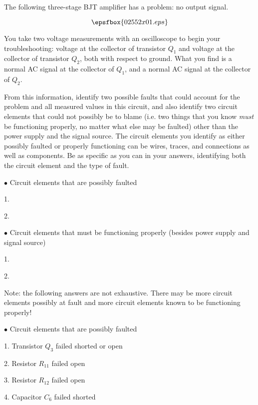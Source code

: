 

The following three-stage BJT amplifier has a problem: no output signal.

$$\epsfbox{02552x01.eps}$$

You take two voltage measurements with an oscilloscope to begin your troubleshooting: voltage at the collector of transistor $Q_1$ and voltage at the collector of transistor $Q_2$, both with respect to ground.  What you find is a normal AC signal at the collector of $Q_1$, and a normal AC signal at the collector of $Q_2$.

From this information, identify two possible faults that could account for the problem and all measured values in this circuit, and also identify two circuit elements that could not possibly be to blame (i.e. two things that you know {\it must} be functioning properly, no matter what else may be faulted) other than the power supply and the signal source.  The circuit elements you identify as either possibly faulted or properly functioning can be wires, traces, and connections as well as components.  Be as specific as you can in your answers, identifying both the circuit element and the type of fault.

\medskip
\goodbreak
\item{$\bullet$} Circuit elements that are possibly faulted
\item{1.}
\item{2.} 
\medskip

\medskip
\goodbreak
\item{$\bullet$} Circuit elements that must be functioning properly (besides power supply and signal source)
\item{1.} 
\item{2.} 
\medskip







Note: the following answers are not exhaustive.  There may be more circuit elements possibly at fault and more circuit elements known to be functioning properly!

\medskip
\goodbreak
\item{$\bullet$} Circuit elements that are possibly faulted
\item{1.} Transistor $Q_3$ failed shorted or open
\item{2.} Resistor $R_{11}$ failed open
\item{3.} Resistor $R_{12}$ failed open
\item{4.} Capacitor $C_6$ failed shorted
\medskip

